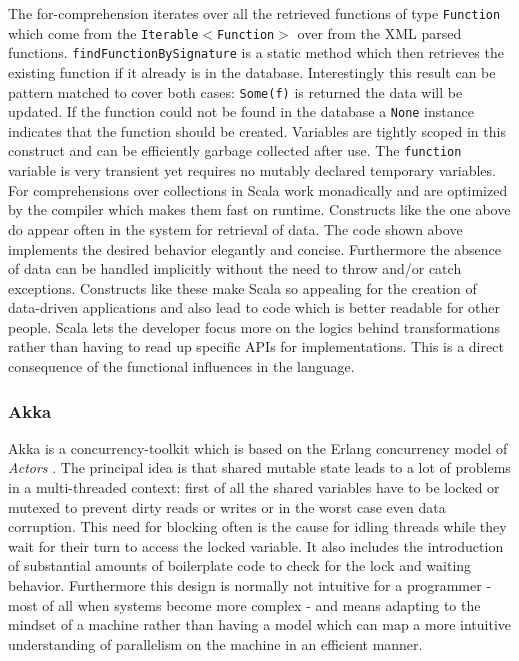 \documentclass[twoside, 11pt]{scrartcl}
\def\code#1{\texttt{#1}}
\begin{document}
The for-comprehension iterates over all the retrieved functions of type \code{Function} which come from the \code{Iterable$<$Function$>$} over from the XML parsed functions. \code{findFunctionBySignature} is a static method which then retrieves the existing function if it already is in the database. Interestingly this result can be pattern matched to cover both cases:  \code{Some(f)} is returned the data will be updated. If the function could not be found in the database a \code{None} instance indicates that the function should be created. Variables are tightly scoped in this construct and can be efficiently garbage collected after use. The \code{function} variable is very transient yet requires no mutably declared temporary variables.
For comprehensions over collections in Scala work monadically and are optimized by the compiler which makes them fast on runtime. Constructs like the one above do appear often in the system for retrieval of data. The code shown above implements the desired behavior elegantly and concise. Furthermore the absence of data  can be handled implicitly without the need to throw and/or catch exceptions. Constructs like these make Scala so appealing for the creation of data-driven applications and also lead to code which is better readable for other people. Scala lets the developer focus more on the logics behind transformations rather than having to read up specific APIs for implementations. This is a direct consequence of the functional influences in the language. 

\subsubsection{Akka}
\label{sec:akka}
Akka \citep{link:akkaHome} is a concurrency-toolkit which is based on the Erlang concurrency model of \textit{Actors} \cite{link:erlangConcurrency}.
The principal idea is that shared mutable state leads to a lot of problems in a multi-threaded context: first of all the shared variables have to be locked or mutexed to prevent dirty reads or writes or in the worst case even data corruption. This need for blocking often is the cause for idling threads while they wait for their turn to access the locked variable.  It also includes the introduction of substantial amounts of boilerplate code to check for the lock and waiting behavior. Furthermore this design is normally not intuitive for a programmer - most of all when systems become more complex - and means adapting to the mindset of a machine rather than having a model which can map a more intuitive understanding of parallelism on the machine in an efficient manner.
\end{document}
